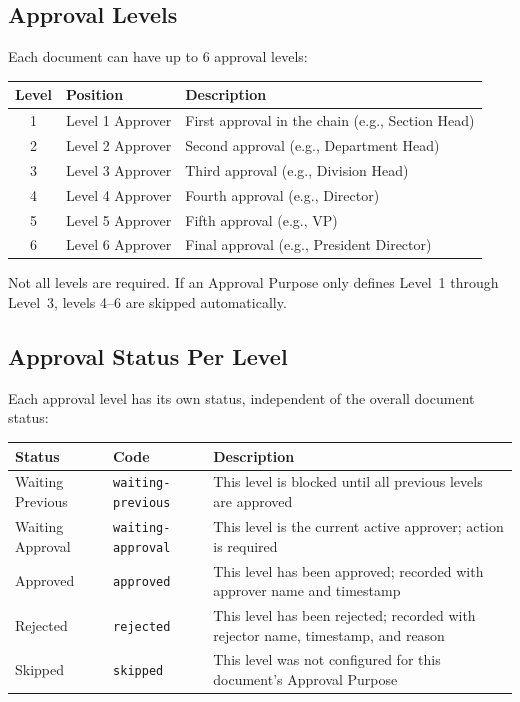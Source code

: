 \subsection{Approval Levels}

Each document can have up to 6 approval levels:

\begin{tabularx}{\textwidth}{@{} c l X @{}}
  \toprule
  \textbf{Level} & \textbf{Position}
    & \textbf{Description} \\
  \midrule
  1 & Level 1 Approver
    & First approval in the chain (e.g., Section Head) \\
  2 & Level 2 Approver
    & Second approval (e.g., Department Head) \\
  3 & Level 3 Approver
    & Third approval (e.g., Division Head) \\
  4 & Level 4 Approver
    & Fourth approval (e.g., Director) \\
  5 & Level 5 Approver
    & Fifth approval (e.g., VP) \\
  6 & Level 6 Approver
    & Final approval (e.g., President Director) \\
  \bottomrule
\end{tabularx}

\vspace{6pt}

Not all levels are required. If an Approval Purpose only
defines Level~1 through Level~3, levels 4--6 are skipped
automatically.

\subsection{Approval Status Per Level}

Each approval level has its own status, independent of the
overall document status:

\begin{tabularx}{\textwidth}{@{} l l X @{}}
  \toprule
  \textbf{Status} & \textbf{Code}
    & \textbf{Description} \\
  \midrule
  Waiting Previous
    & \texttt{waiting-previous}
    & This level is blocked until all previous
      levels are approved \\
  Waiting Approval
    & \texttt{waiting-approval}
    & This level is the current active approver;
      action is required \\
  Approved
    & \texttt{approved}
    & This level has been approved; recorded with
      approver name and timestamp \\
  Rejected
    & \texttt{rejected}
    & This level has been rejected; recorded with
      rejector name, timestamp, and reason \\
  Skipped
    & \texttt{skipped}
    & This level was not configured for this
      document's Approval Purpose \\
  \bottomrule
\end{tabularx}

